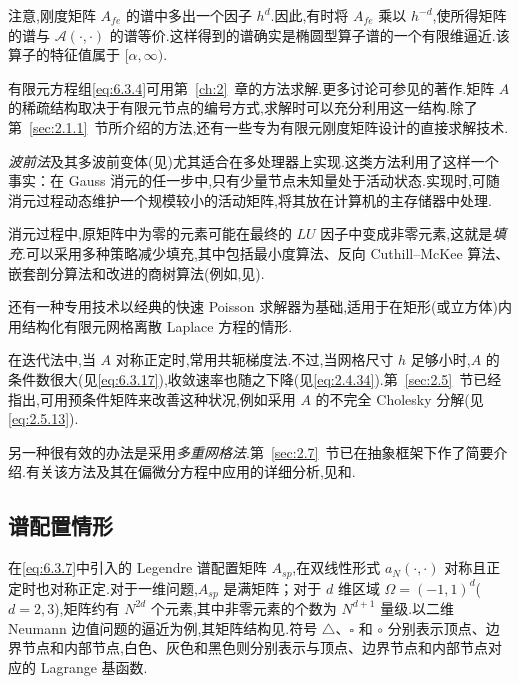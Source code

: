 注意,刚度矩阵 \(A_{fe}\) 的谱中多出一个因子 \(h^d\).因此,有时将 \(A_{fe}\) 乘以 \(h^{-d}\),使所得矩阵的谱与 \(\mathcal A(\cdot,\cdot)\) 的谱等价.这样得到的谱确实是椭圆型算子谱的一个有限维逼近.该算子的特征值属于 \([\alpha,\infty)\).

有限元方程组\eqref{eq:6.3.4}可用第~\ref{ch:2}~章的方法求解.更多讨论可参见的著作.矩阵 \(A\) 的稀疏结构取决于有限元节点的编号方式,求解时可以充分利用这一结构.除了第~\ref{sec:2.1.1}~节所介绍的方法,还有一些专为有限元刚度矩阵设计的直接求解技术.

\emph{波前法}及其多波前变体(见)尤其适合在多处理器上实现.这类方法利用了这样一个事实：在 Gauss 消元的任一步中,只有少量节点未知量处于活动状态.实现时,可随消元过程动态维护一个规模较小的活动矩阵,将其放在计算机的主存储器中处理.

消元过程中,原矩阵中为零的元素可能在最终的 \(LU\) 因子中变成非零元素,这就是\emph{填充}.可以采用多种策略减少填充,其中包括最小度算法、反向 Cuthill--McKee 算法、嵌套剖分算法和改进的商树算法(例如,见).

还有一种专用技术以经典的快速 Poisson 求解器为基础,适用于在矩形(或立方体)内用结构化有限元网格离散 Laplace 方程的情形.

在迭代法中,当 \(A\) 对称正定时,常用共轭梯度法.不过,当网格尺寸 \(h\) 足够小时,\(A\) 的条件数很大(见\eqref{eq:6.3.17}),收敛速率也随之下降(见\eqref{eq:2.4.34}).第~\ref{sec:2.5}~节已经指出,可用预条件矩阵来改善这种状况,例如采用 \(A\) 的不完全 Cholesky 分解(见\eqref{eq:2.5.13}).

另一种很有效的办法是采用\emph{多重网格法}.第~\ref{sec:2.7}~节已在抽象框架下作了简要介绍.有关该方法及其在偏微分方程中应用的详细分析,见和.

\subsection{谱配置情形}\label{sec:6.3.3}

在\eqref{eq:6.3.7}中引入的 Legendre 谱配置矩阵 \(A_{sp}\),在双线性形式 \(a_N(\cdot,\cdot)\) 对称且正定时也对称正定.对于一维问题,\(A_{sp}\) 是满矩阵；对于 \(d\) 维区域 \(\Omega=(-1,1)^d\)(\(d=2,3\)),矩阵约有 \(N^{2d}\) 个元素,其中非零元素的个数为 \(N^{d+1}\) 量级.以二维 Neumann 边值问题的逼近为例,其矩阵结构见.符号 \(\triangle\)、\(\square\) 和 \(\circ\) 分别表示顶点、边界节点和内部节点,白色、灰色和黑色则分别表示与顶点、边界节点和内部节点对应的 Lagrange 基函数.

